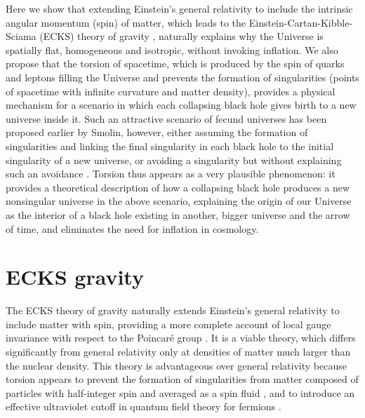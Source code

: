 \documentclass[prd,onecolumn,nofootinbib,showkeys]{revtex4}
\begin{document}
Here we show that extending Einstein's general relativity to include the intrinsic angular momentum (spin) of matter, which leads to the Einstein-Cartan-Kibble-Sciama (ECKS) theory of gravity \cite{Kib,Sci1,Sci2,HD,HHKN,Lord,Sha,Ham,Niko0}, naturally explains why the Universe is spatially flat, homogeneous and isotropic, without invoking inflation.
We also propose that the torsion of spacetime, which is produced by the spin of quarks and leptons filling the Universe and prevents the formation of singularities (points of spacetime with infinite curvature and matter density), provides a physical mechanism for a scenario in which each collapsing black hole gives birth to a new universe inside it.
Such an attractive scenario of fecund universes has been proposed earlier by Smolin, however, either assuming the formation of singularities and linking the final singularity in each black hole to the initial singularity of a new universe, or avoiding a singularity but without explaining such an avoidance \cite{Smo1,Smo2}.
Torsion thus appears as a very plausible phenomenon: it provides a theoretical description of how a collapsing black hole produces a new nonsingular universe in the above scenario, explaining the origin of our Universe as the interior of a black hole existing in another, bigger universe \cite{Pat,Stu} and the arrow of time, and eliminates the need for inflation in cosmology.

\section{ECKS gravity}
The ECKS theory of gravity naturally extends Einstein's general relativity to include matter with spin, providing a more complete account of local gauge invariance with respect to the Poincar\'{e} group \cite{Kib,Sci1,Sci2,HD,HHKN,Lord,Sha,Ham,Niko0}.
It is a viable theory, which differs significantly from general relativity only at densities of matter much larger than the nuclear density.
This theory is advantageous over general relativity because torsion appears to prevent the formation of singularities from matter composed of particles with half-integer spin and averaged as a spin fluid \cite{Kop,Tra,HHK,dSS1,dSS2}, and to introduce an effective ultraviolet cutoff in quantum field theory for fermions \cite{Niko2}.
\end{document}
